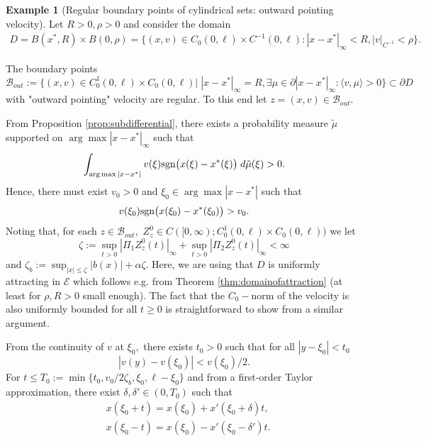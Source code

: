 \documentclass[10pt, reqno]{amsart}
\newcommand{\e}{\mathcal{E}}
\theoremstyle{definition}
\newtheorem{example}{Example}
\numberwithin{lem}{section}
\numberwithin{cor}{section}
\numberwithin{prop}{section}
\numberwithin{thm}{section}
\numberwithin{dfn}{section}
\begin{document}
\begin{example}[Regular boundary points of cylindrical sets: outward pointing velocity]\label{ex:regularculinders}
 Let $R>0, \rho>0$ and consider the domain \begin{equation}\label{eq:cylindricalset}
    \begin{aligned}
      D=B(x^*, R)\times B(0, \rho)=\bigg\{ (x,v)\in C_0(0,\ell)\times C^{-1}(0,\ell):   |x-x^*|_{\infty}< R, |v|_{C^{-1}}<\rho\bigg\}.  
    \end{aligned}
\end{equation}


\noindent The boundary points 
$$\mathcal{B}_{out}:=\bigg\{(x,v)\in C^1_0(0,\ell)\times C_0(0,\ell)\bigg| \;|x-x^*|_{\infty}=R, \exists\mu\in\partial|x-x^*|_{\infty}:\langle v, \mu\rangle>0\bigg\}\subset \partial D $$
with "outward pointing" velocity are regular. To this end let $z=(x,v)\in\mathcal{B}_{out}.$

From Proposition \ref{prop:subdifferential}, there exists a probability measure $\tilde{\mu}$ supported on $\arg\max|x-x^*|_\infty$ such that $$\int_{\arg\max|x-x^*|} v(\xi)\textnormal{sgn}\big(x(\xi)-x^*(\xi)\big)\;d\tilde{\mu}(\xi)>0.$$
Hence, there must exist $v_0>0$ and $\xi_0\in \arg\max|x-x^*|$ such that $$v(\xi_0)\textnormal{sgn}\big(x(\xi_0)-x^*(\xi_0)\big)>v_0.$$
Noting that, for each $z\in \mathcal{B}_{out},$ $Z^0_z\in C([0,\infty);C^1_0(0,\ell)\times C_0(0,\ell)) $ we let
$$\zeta:=\sup_{ t>0}|\Pi_1Z^0_z(t)|_{\infty}+\sup_{t>0}|\Pi_2Z^0_z(t)|_{\infty}<\infty    $$
and 
$\zeta_b:=\sup_{|x|\leq \zeta}|b(x)|+\alpha\zeta. $ Here, we are using that $D$ is uniformly  attracting in $\e$ which follows e.g. from Theorem \ref{thm:domainofattraction} (at least for $\rho, R>0$ small enough). The fact that the $C_0-$norm of the velocity is also uniformly bounded for all $t\geq 0$ is straightforward to show from a similar argument.

 From the continuity of $v$ at $\xi_0,$ there exists $t_0>0$ such that for all $|y-\xi_0|<t_0$ 
 \begin{equation}\label{eq:vcontinuity}
 |v(y)-v(\xi_0)|<v(\xi_0)/2.
 \end{equation}
For
$t\leq T_0:=\min\{t_0, v_0/2\zeta_b, 
 \xi_0, \ell-\xi_0\}$ and from a first-order Taylor approximation, there exist   $\delta,  \delta'\in(0, T_0)$ such that 
\begin{equation*}\label{eq:1storderTaylor}
\begin{aligned}     &x(\xi_0+t)=x(\xi_0)+x'(\xi_0+\delta)t, \\&
     x(\xi_0-t)=x(\xi_0)-x'(\xi_0-\delta')t.
\end{aligned}
\end{equation*}


\end{example}
\end{document}
